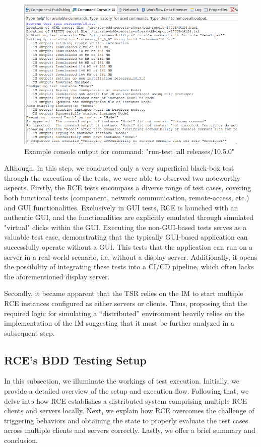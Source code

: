 \begin{figure}
    \centering
    \includegraphics[width=\linewidth]{files/figures/rce-execute-tests.png}
    \caption{Example console output for command: "run-test :all releases/10.5.0"}
    \label{fig:rce-test-output}
\end{figure}


Although, in this step, we conducted only a very superficial black-box test through the execution of the tests, we were able to observed two noteworthy aspects. Firstly, the \ac{RCE} tests encompass a diverse range of test cases, covering both functional tests (component, network communication, remote-access, etc.) and \ac{GUI} functionalities. Exclusively in \ac{GUI} tests, \ac{RCE} is launched with an authentic \ac{GUI}, and the functionalities are explicitly emulated through simulated "virtual" clicks within the \ac{GUI}.
Executing the non-\acs{GUI}-based tests serves as a valuable test case, demonstrating that the typically \acs{GUI}-based application can successfully operate without a \acs{GUI}. This tests that the application can run on a server in a real-world scenario, i.e, without a display server. Additionally, it opens the possibility of integrating these tests into a CI/CD pipeline, which often lacks the aforementioned display server.

Secondly, it became apparent that the \ac{TSR} relies on the \ac{IM} to start multiple \ac{RCE} instances configured as either servers or clients.
Thus, proposing that the required logic for simulating a “distributed” environment heavily relies on the implementation of the \ac{IM} suggesting that it must be further analyzed in a subsequent step.

\subsection{\ac{RCE}'s BDD Testing Setup}
\label{subsec:BuiltinBDDTest}
In this subsection, we illuminate the workings of test execution. Initially, we provide a detailed overview of the setup and execution flow. Following that, we delve into how \ac{RCE} establishes a distributed system comprising multiple \ac{RCE} clients and servers locally. Next, we explain how \ac{RCE} overcomes the challenge of triggering behaviors and obtaining the state to properly evaluate the test cases across multiple clients and servers correctly. Lastly, we offer a brief summary and conclusion.


